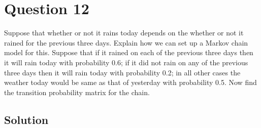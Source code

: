 \section*{Question 12}

Suppose that whether or not it rains today depends on the whether or not it rained for the previous three days.
Explain how we can set up a Markov chain model for this.
Suppose that if it rained on each of the previous three days then it will rain today with probability 0.6; if it did not rain on any of the previous three days then it will rain today with probability 0.2; in all other cases the weather today would be same as that of yesterday with probability 0.5.
Now find the transition probability matrix for the chain.

\subsection*{Solution}
